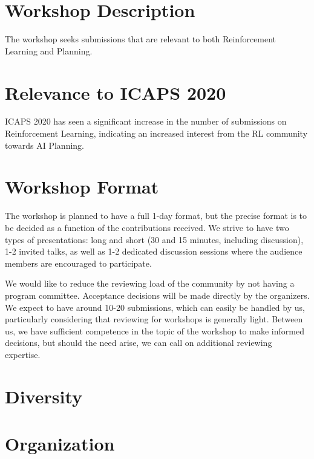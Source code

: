 \documentclass[10pt]{article}
\begin{document}
\section*{Workshop Description}

The workshop seeks submissions that are relevant to both Reinforcement Learning
and Planning. 



\section*{Relevance to ICAPS 2020}
ICAPS 2020 has seen a significant increase in the number of submissions on
Reinforcement Learning, indicating an increased interest from the RL community
towards AI Planning.


\section*{Workshop Format}

The workshop is planned to have a full 1-day format, but the precise format is
to be decided as a function of the contributions received. We strive to have two
types of presentations: long and short (30 and 15 minutes, including
discussion), 1-2 invited talks, as well as 1-2 dedicated discussion sessions
where the audience members are encouraged to participate.

We would like to reduce the reviewing load of the community by not having a
program committee. Acceptance decisions will be made directly by the organizers.
We expect to have around 10-20 submissions, which can easily be handled by us,
particularly considering that reviewing for workshops is generally light.
Between us, we have sufficient competence in the topic of the workshop to make
informed decisions, but should the need arise, we can call on additional
reviewing expertise.


\section*{Diversity}


\section*{Organization}

\end{document}
